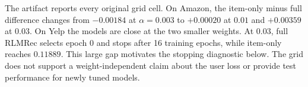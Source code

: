 The artifact reports every original grid cell. On Amazon,
the item-only minus full difference changes from $-0.00184$ at $\alpha=0.003$
to $+0.00020$ at $0.01$ and $+0.00359$ at $0.03$. On Yelp the models are
close at the two smaller weights. At $0.03$, full RLMRec selects epoch 0 and
stops after 16 training epochs, while item-only reaches $0.11889$.
This large gap motivates the stopping diagnostic below. The grid does not
support a weight-independent claim about the user loss or provide test
performance for newly tuned models.
